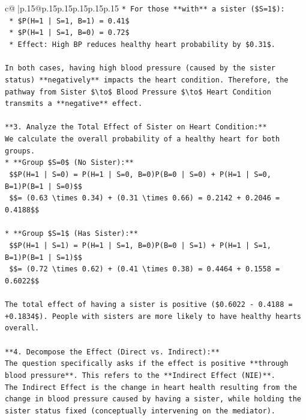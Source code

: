 \documentclass{article}
\begin{document}
{\begin{supertabular}{c@{$\;$}|p{.15\linewidth}@{}p{.15\linewidth}p{.15\linewidth}p{.15\linewidth}p{.15\linewidth}p{.15\linewidth}}
{{{\texttt{*   For those **with** a sister (\$S=1\$):} \\
\texttt{    *   \$P(H=1 | S=1, B=1) = 0.41\$} \\
\texttt{    *   \$P(H=1 | S=1, B=0) = 0.72\$} \\
\texttt{    *   Effect: High BP reduces healthy heart probability by \$0.31\$.} \\
\\ 
\texttt{In both cases, having high blood pressure (caused by the sister status) **negatively** impacts the heart condition. Therefore, the pathway from Sister \$\textbackslash{}to\$ Blood Pressure \$\textbackslash{}to\$ Heart Condition transmits a **negative** effect.} \\
\\ 
\texttt{**3. Analyze the Total Effect of Sister on Heart Condition:**} \\
\texttt{We calculate the overall probability of a healthy heart for both groups.} \\
\texttt{*   **Group \$S=0\$ (No Sister):**} \\
\texttt{    \$\$P(H=1 | S=0) = P(H=1 | S=0, B=0)P(B=0 | S=0) + P(H=1 | S=0, B=1)P(B=1 | S=0)\$\$} \\
\texttt{    \$\$= (0.63 \textbackslash{}times 0.34) + (0.31 \textbackslash{}times 0.66) = 0.2142 + 0.2046 = 0.4188\$\$} \\
\\ 
\texttt{*   **Group \$S=1\$ (Has Sister):**} \\
\texttt{    \$\$P(H=1 | S=1) = P(H=1 | S=1, B=0)P(B=0 | S=1) + P(H=1 | S=1, B=1)P(B=1 | S=1)\$\$} \\
\texttt{    \$\$= (0.72 \textbackslash{}times 0.62) + (0.41 \textbackslash{}times 0.38) = 0.4464 + 0.1558 = 0.6022\$\$} \\
\\ 
\texttt{The total effect of having a sister is positive (\$0.6022 {-} 0.4188 = +0.1834\$). People with sisters are more likely to have healthy hearts overall.} \\
\\ 
\texttt{**4. Decompose the Effect (Direct vs. Indirect):**} \\
\texttt{The question specifically asks if the effect is positive **through blood pressure**. This refers to the **Indirect Effect (NIE)**.} \\
\texttt{The Indirect Effect is the change in heart health resulting from the change in blood pressure caused by having a sister, while holding the sister status fixed (conceptually intervening on the mediator).} \\
}}}
\end{supertabular}}
\end{document}
